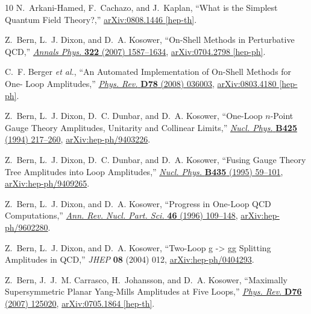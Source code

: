 \documentclass[11pt, reqno]{article}
\begin{document}
\begin{thebibliography}{10}
N.~Arkani-Hamed, F.~Cachazo, and J.~Kaplan, ``{What is the Simplest Quantum
  Field Theory?},''
\href{http://arxiv.org/abs/0808.1446}{{ arXiv:0808.1446 [hep-th]}}.

Z.~Bern, L.~J. Dixon, and D.~A. Kosower, ``{On-Shell Methods in Perturbative
  QCD},'' \href{http://dx.doi.org/10.1016/j.aop.2007.04.014}{{\em Annals Phys.}
  {\bf 322} (2007)  1587--1634},
\href{http://arxiv.org/abs/0704.2798}{{ arXiv:0704.2798 [hep-ph]}}.

C.~F. Berger {\em et al.}, ``{An Automated Implementation of On-Shell Methods
  for One- Loop Amplitudes},''
  \href{http://dx.doi.org/10.1103/PhysRevD.78.036003}{{\em Phys. Rev.} {\bf
  D78} (2008)  036003},
\href{http://arxiv.org/abs/0803.4180}{{ arXiv:0803.4180 [hep-ph]}}.

Z.~Bern, L.~J. Dixon, D.~C. Dunbar, and D.~A. Kosower, ``{One-Loop $n$-Point
  Gauge Theory Amplitudes, Unitarity and Collinear Limits},''
  \href{http://dx.doi.org/10.1016/0550-3213(94)90179-1}{{\em Nucl. Phys.} {\bf
  B425} (1994)  217--260},
\href{http://arxiv.org/abs/hep-ph/9403226}{{ arXiv:hep-ph/9403226}}.

Z.~Bern, L.~J. Dixon, D.~C. Dunbar, and D.~A. Kosower, ``{Fusing Gauge Theory
  Tree Amplitudes into Loop Amplitudes},''
  \href{http://dx.doi.org/10.1016/0550-3213(94)00488-Z}{{\em Nucl. Phys.} {\bf
  B435} (1995)  59--101},
\href{http://arxiv.org/abs/hep-ph/9409265}{{ arXiv:hep-ph/9409265}}.

Z.~Bern, L.~J. Dixon, and D.~A. Kosower, ``{Progress in One-Loop QCD
  Computations},'' \href{http://dx.doi.org/10.1146/annurev.nucl.46.1.109}{{\em
  Ann. Rev. Nucl. Part. Sci.} {\bf 46} (1996)  109--148},
\href{http://arxiv.org/abs/hep-ph/9602280}{{ arXiv:hep-ph/9602280}}.

Z.~Bern, L.~J. Dixon, and D.~A. Kosower, ``{Two-Loop g -> gg Splitting
  Amplitudes in QCD},'' {\em JHEP} {\bf 08} (2004)  012,
\href{http://arxiv.org/abs/hep-ph/0404293}{{ arXiv:hep-ph/0404293}}.

Z.~Bern, J.~J.~M. Carrasco, H.~Johansson, and D.~A. Kosower, ``{Maximally
  Supersymmetric Planar Yang-Mills Amplitudes at Five Loops},''
  \href{http://dx.doi.org/10.1103/PhysRevD.76.125020}{{\em Phys. Rev.} {\bf
  D76} (2007)  125020},
\href{http://arxiv.org/abs/0705.1864}{{ arXiv:0705.1864 [hep-th]}}.


\end{thebibliography}
\end{document}
